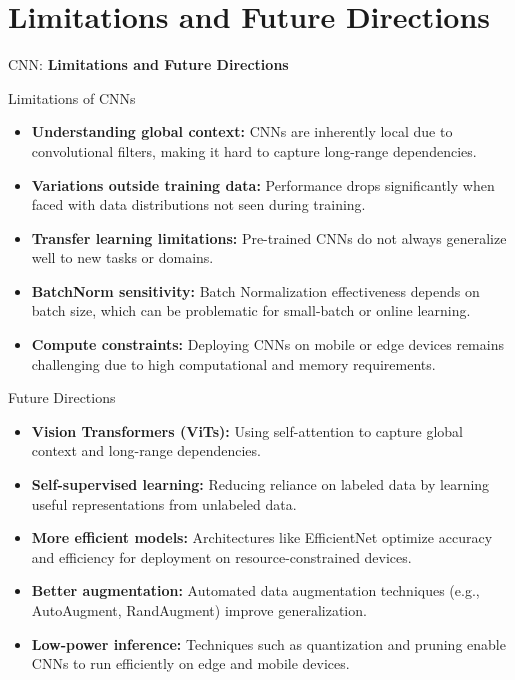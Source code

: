 \section{Limitations and Future Directions}
\begin{frame}{}
    \LARGE CNN: \textbf{Limitations and Future Directions}
\end{frame}

\begin{frame}{Limitations of CNNs}
    \begin{itemize}
        \item \textbf{Understanding global context:} CNNs are inherently local due to convolutional filters, making it hard to capture long-range dependencies.
        \item \textbf{Variations outside training data:} Performance drops significantly when faced with data distributions not seen during training.
        \item \textbf{Transfer learning limitations:} Pre-trained CNNs do not always generalize well to new tasks or domains.
        \item \textbf{BatchNorm sensitivity:} Batch Normalization effectiveness depends on batch size, which can be problematic for small-batch or online learning.
        \item \textbf{Compute constraints:} Deploying CNNs on mobile or edge devices remains challenging due to high computational and memory requirements.
    \end{itemize}
\end{frame}

\begin{frame}{Future Directions}
    \begin{itemize}
        \item \textbf{Vision Transformers (ViTs):} Using self-attention to capture global context and long-range dependencies.
        \item \textbf{Self-supervised learning:} Reducing reliance on labeled data by learning useful representations from unlabeled data.
        \item \textbf{More efficient models:} Architectures like EfficientNet optimize accuracy and efficiency for deployment on resource-constrained devices.
        \item \textbf{Better augmentation:} Automated data augmentation techniques (e.g., AutoAugment, RandAugment) improve generalization.
        \item \textbf{Low-power inference:} Techniques such as quantization and pruning enable CNNs to run efficiently on edge and mobile devices.
    \end{itemize}
\end{frame}